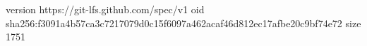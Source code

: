 version https://git-lfs.github.com/spec/v1
oid sha256:f3091a4b57ca3c7217079d0c15f6097a462acaf46d812ec17afbe20c9bf74e72
size 1751
